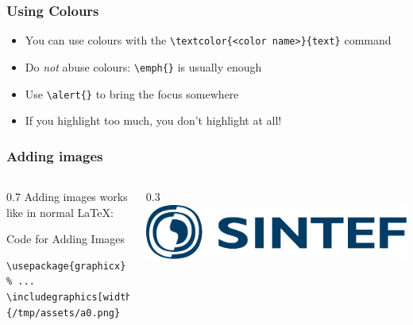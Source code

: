 \documentclass{beamer}
\begin{document}
\begin{frame}[fragile]
\frametitle{Using Colours}
\begin{itemize}[<alert@2>]
  \item You can use colours with the
        \verb|\textcolor{<color name>}{text}| command
  \item Do \emph{not} abuse colours: \verb|\emph{}| is usually enough
  \item Use \verb|\alert{}| to bring the \alert<2->{focus} somewhere
  \item<2- | alert@2> If you highlight too much, you don't highlight at all!
\end{itemize}
\end{frame}

\begin{frame}[fragile]
\frametitle{Adding images}
\begin{columns}
\begin{column}{0.7\textwidth}
Adding images works like in normal \LaTeX:
\begin{block}{Code for Adding Images}
\begin{verbatim}
\usepackage{graphicx}
% ...
\includegraphics
[width=\textwidth]{Sintef_logo_blue}
\end{verbatim}
\end{block}
\end{column}
\end{columns}
\end{frame}
\end{document}
